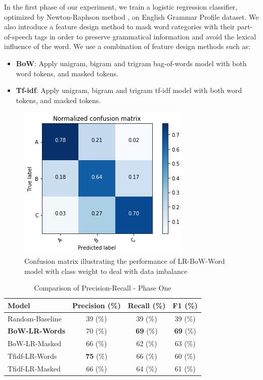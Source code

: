 In the first phase of our experiment, we train a logistic regression classifier, optimized by Newton-Raphson method , on English Grammar Profile dataset. We also introduce a  feature design method to mask word categories with their part-of-speech tags in order to preserve grammatical information and avoid the lexical influence of the word. We use a combination of feature design methods such as:

\begin{itemize}
	\item \textbf{BoW}: Apply unigram, bigram and trigram bag-of-words model with both word tokens, and masked tokens.
	\item \textbf{Tf-idf}: Apply unigram, bigram and trigram tf-idf model with both word tokens, and masked tokens.
\end{itemize}


\begin{figure}[t]
	\centering
    \includegraphics[width=.75\linewidth]{../Figures/conf_matrix_iter1.png} 
	\caption{Confusion matrix illustrating the performance of LR-BoW-Word model with class weight to deal with data imbalance}
	\label{fig:cmdstudy}
\end{figure}

\begin{table}
\centering
\caption {Comparison of Precision-Recall - Phase One}
\begin{tabular}{l|c|c|c}
Model  &  Precision (\%) &  Recall (\%)  & F1 (\%) \\
\hline
Random-Baseline  &  39 (\%) &  39 (\%)  & 39 (\%) \\
\textbf{BoW-LR-Words}  &  70 (\%) &  \textbf{69} (\%)  & \textbf{69} (\%) \\
BoW-LR-Masked  &  66 (\%) &  62 (\%)  & 63 (\%) \\
Tfidf-LR-Words  &  \textbf{75} (\%) &  66 (\%)  & 60 (\%) \\
Tfidf-LR-Masked  &  66 (\%) &  64 (\%)  & 61 (\%) \\
\hline

\end{tabular}
\label {tb:flickre2e}
\end{table}

